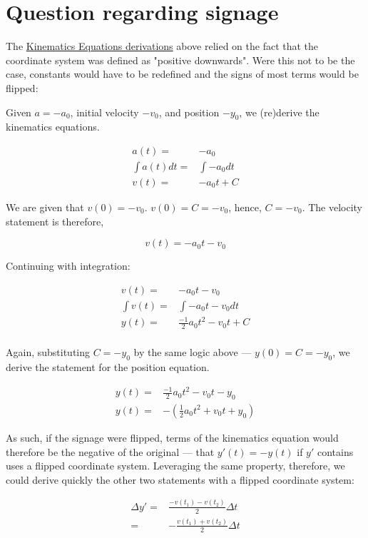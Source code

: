 \documentclass[letterpaper]{article}
\begin{document}
\section{Question regarding signage}
\label{sec:org2490c7a}
The \hyperref[sec:orgd18150a]{Kinematics Equations derivations} above relied on the fact that the coordinate system was defined as "positive downwards". Were this not to be the case, constants would have to be redefined and the signs of most terms would be flipped:

Given \(a=-a_0\), initial velocity \(-v_0\), and position \(-y_0\), we (re)derive the kinematics equations.

\begin{align}
    a(t) =& -a_0 \\
    \int a(t) dt =& \int -a_0 dt \\
    v(t) =& -a_0t + C 
\end{align}

We are given that \(v(0)=-v_0\). \(v(0) = C = -v_0\), hence, \(C=-v_0\). The velocity statement is therefore,

\begin{equation}
    v(t) = -a_0t-v_0
\end{equation}

Continuing with integration:

\begin{align}
    v(t) =& -a_0t - v_0 \\
    \int v(t) =& \int -a_0t - v_0 dt \\
    y(t) =& \frac{-1}{2}a_0t^2 - v_0t+C \\
\end{align}

Again, substituting \(C = -y_0\) by the same logic above --- \(y(0) = C = -y_0\), we derive the statement for the position equation.

\begin{align}
    y(t) =& \frac{-1}{2}a_0t^2 - v_0t - y_0 \\
    y(t) =& -(\frac{1}{2}a_0t^2 + v_0t + y_0)
\end{align}

As such, if the signage were flipped, terms of the kinematics equation would therefore be the negative of the original --- that \(y'(t) = -y(t)\) if \(y'\) contains uses a flipped coordinate system. Leveraging the same property, therefore, we could derive quickly the other two statements with a flipped coordinate system:

\begin{align}
    \Delta y' =& \frac{-v(t_1)-v(t_2)}{2}\Delta t \\
    =& -\frac{v(t_1)+v(t_2)}{2}\Delta t
\end{align}
\end{document}
